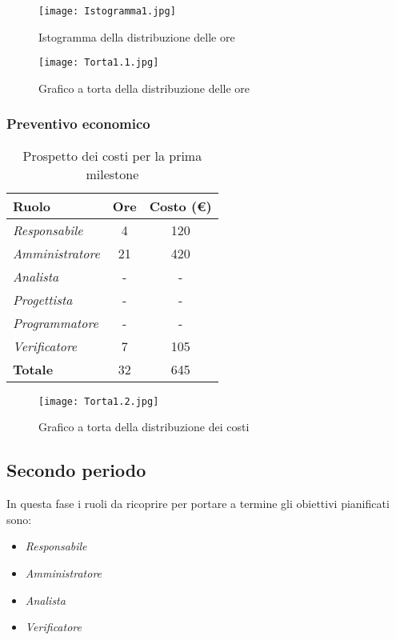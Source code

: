 \begin{figure}[!ht]
    \texttt{[image: Istogramma1.jpg]}
    \caption{Istogramma della distribuzione delle ore} 
\end{figure}

\begin{figure}[!ht]
    \texttt{[image: Torta1.1.jpg]}
    \caption{Grafico a torta della distribuzione delle ore} 
\end{figure}

\newpage
\subsubsection{Preventivo economico}

\begin{table}[!ht]
    \centering
    \begin{tabular}{|l|c|c|}
    \hline
    \textbf{Ruolo} & \multicolumn{1}{l|}{\textbf{Ore}} & \multicolumn{1}{l|}{\textbf{Costo (€)}} \\ \hline
    \textit{Responsabile} & 4 & 120 \\ \hline
    \textit{Amministratore} & 21 & 420 \\ \hline
    \textit{Analista} & - & - \\ \hline
    \textit{Progettista} & - & - \\ \hline
    \textit{Programmatore} & - & - \\ \hline
    \textit{Verificatore} & 7 & 105 \\ \hline
    \textbf{Totale} & 32 & 645 \\ \hline
    \end{tabular}
    \caption{Prospetto dei costi per la prima milestone}
\end{table}

\begin{figure}[!ht]
    \texttt{[image: Torta1.2.jpg]}
    \caption{Grafico a torta della distribuzione dei costi} 
\end{figure}

\newpage
\subsection{Secondo periodo}

In questa fase i ruoli da ricoprire per portare a termine gli obiettivi
pianificati sono:
\begin{itemize}
    \item \textit{Responsabile}
    \item \textit{Amministratore}
    \item \textit{Analista}
    \item \textit{Verificatore}
\end{itemize}

